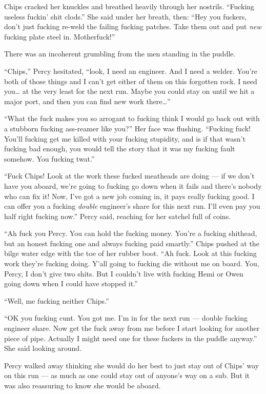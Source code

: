\documentclass[
]{scrbook}
\begin{document}
Chips cracked her knuckles and breathed heavily through her nostrils.
``Fucking useless fuckin' shit clods.'' She said under her breath, then:
``Hey you fuckers, don't just fucking re-weld the failing fucking
patches. Take them out and put \emph{new} fucking plate steel in.
Motherfuck!''

There was an incoherent grumbling from the men standing in the puddle.

``Chips,'' Percy hesitated, ``look, I need an engineer. And I need a
welder. You're both of those things and I can't get either of them on
this forgotten rock. I need you\ldots{} at the very least for the next
run. Maybe you could stay on until we hit a major port, and then you can
find new work there\ldots{}''

``What the fuck makes you so arrogant to fucking think I would go back
out with a stubborn fucking ass-reamer like you?'' Her face was
flushing. ``Fucking fuck! You'll fucking get me killed with your fucking
stupidity, and is if that wasn't fucking bad enough, you would tell the
story that it was my fucking fault somehow. You fucking twat.''

``Fuck Chips! Look at the work these fucked meatheads are doing --- if
we don't have you aboard, we're going to fucking go down when it fails
and there's nobody who can fix it! Now, I've got a new job coming in, it
pays really fucking good. I can offer you a fucking \emph{double}
engineer's share for this next run. I'll even pay you half right fucking
now.'' Percy said, reaching for her satchel full of coins.

``Ah fuck you Percy. You can hold the fucking money. You're a fucking
shithead, but an honest fucking one and always fucking paid smartly.''
Chips pushed at the bilge water edge with the toe of her rubber boot.
``Ah fuck. Look at this fucking work they're fucking doing. Y'all going
to fucking die without me on board. You, Percy, I don't give two shits.
But I couldn't live with fucking Hemi or Owen going down when I could
have stopped it.''

``Well, me fucking neither Chips.''

``OK you fucking cunt. You got me. I'm in for the next run --- double
fucking engineer share. Now get the fuck away from me before I start
looking for another piece of pipe. Actually I might need one for these
fuckers in the puddle anyway.'' She said looking around.

Percy walked away thinking she would do her best to just stay out of
Chips' way on this run --- as much as one could stay out of anyone's way
on a sub. But it was also reassuring to know she would be aboard.
\end{document}
